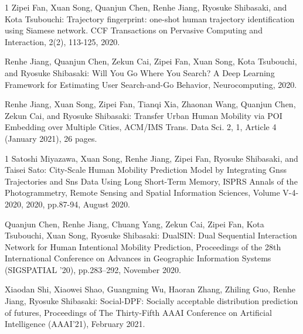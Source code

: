 \begin{雑誌論文}{1}
Zipei Fan, Xuan Song, Quanjun Chen, Renhe Jiang, Ryosuke Shibasaki, and Kota Tsubouchi:  
Trajectory fingerprint: one-shot human trajectory identification using Siamese network. CCF Transactions on Pervasive Computing and Interaction, 2(2), 113-125, 2020.

Renhe Jiang, Quanjun Chen, Zekun Cai, Zipei Fan, Xuan Song, Kota Tsubouchi, and Ryosuke Shibasaki: 
Will You Go Where You Search? A Deep Learning Framework for Estimating User Search-and-Go Behavior, Neurocomputing, 2020.

Renhe Jiang, Xuan Song, Zipei Fan, Tianqi Xia, Zhaonan Wang, Quanjun Chen, Zekun Cai, and Ryosuke Shibasaki: 
Transfer Urban Human Mobility via POI Embedding over Multiple Cities, ACM/IMS Trans. Data Sci. 2, 1, Article 4 (January 2021), 26 pages.
\end{雑誌論文}

\begin{査読付}{1}
Satoshi Miyazawa, Xuan Song, Renhe Jiang, Zipei Fan, Ryosuke Shibasaki, and Taisei Sato:
City-Scale Human Mobility Prediction Model by Integrating Gnss Trajectories and Sns Data Using Long Short-Term Memory, ISPRS Annals of the Photogrammetry, Remote Sensing and Spatial Information Sciences, Volume V-4-2020, 2020, pp.87-94, August 2020.

Quanjun Chen, Renhe Jiang, Chuang Yang, Zekun Cai, Zipei Fan, Kota Tsubouchi, Xuan Song, Ryosuke Shibasaki: 
DualSIN: Dual Sequential Interaction Network for Human Intentional Mobility Prediction, Proceedings of the 28th International Conference on Advances in Geographic Information Systems (SIGSPATIAL '20),
pp.283–292, November 2020.

Xiaodan Shi, Xiaowei Shao, Guangming Wu, Haoran Zhang, Zhiling Guo, Renhe Jiang, Ryosuke Shibasaki: 
Social-DPF: Socially acceptable distribution prediction of futures, Proceedings of The Thirty-Fifth AAAI Conference on Artificial Intelligence (AAAI'21), February 2021.
\end{査読付}


